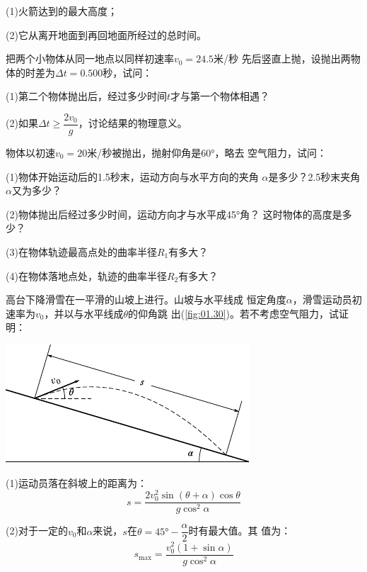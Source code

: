 \begin{exercises}
(1)火箭达到的最大高度；

(2)它从离开地面到再回地面所经过的总时间。

\exercise 把两个小物体从同一地点以同样初速率$v_0=24.5$米/秒
先后竖直上抛，设抛出两物体的时差为$\Delta t=0.500$秒，试问：

\renewcommand{\hsp}{\hspace{0.2em}}
{(1)第二个物体抛出后，经过多少时间\hsp $t$\hsp 才与第一个物体相遇？}

\vspace{-0.15em}(2)如果$\Delta t\geqslant\dfrac{2v_0}{g}$，讨论结果的物理意义。\vspace{-0.15em}

\exercise 物体以初速$v_0=20$米/秒被抛出，抛射仰角是\ang{60;;}，略去
空气阻力，试问：

(1)物体开始运动后的1.5秒末，运动方向与水平方向的夹角
$\alpha$是多少？2.5秒末夹角$\alpha$又为多少？

(2)物体抛出后经过多少时间，运动方向才与水平成\ang{45;;}角？
这时物体的高度是多少？

(3)在物体轨迹最高点处的曲率半径$R_1$有多大？

(4)在物体落地点处，轨迹的曲率半径$R_2$有多大？

\exercise 高台下降滑雪在一平滑的山坡上进行。山坡与水平线成
恒定角度$\alpha$，滑雪运动员初速率为$v_0$，并以与水平线成$\theta$的仰角跳
出(\ref{fig:01.30})。若不考虑空气阻力，试证明：
\begin{figurex}
  \centering
  \includegraphics{figure/fig01.30}
  \caption{}
  \label{fig:01.30}
\end{figurex}

(1)运动员落在斜坡上的距离为：
\begin{equation*}
  s=\frac{2 v_{0}^{2} \sin \left(\theta+\alpha\right) \cos \theta}{g \cos ^{2} \alpha}
\end{equation*}

(2)对于一定的$v_0$和$\alpha$来说，$s$在$\theta=\ang{45;;}-\dfrac{\alpha}{2}$时有最大值。其
值为：
\begin{equation*}
  s_{\max }=\frac{v_{0}^{2}\left(1+\sin \alpha\right)}{g \cos ^{2} \alpha}
\end{equation*}


\end{exercises}
